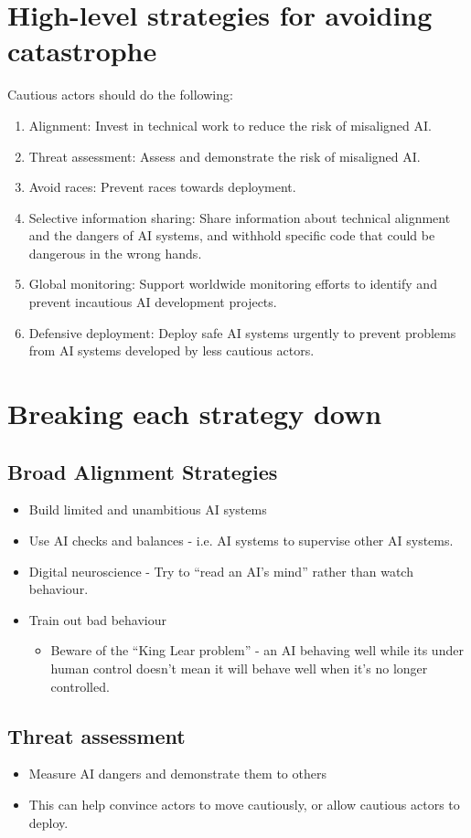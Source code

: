 \documentclass{article}
\begin{document}
\begin{multicols}{2}
\section{High-level strategies for avoiding catastrophe}
Cautious actors should do the following:
\begin{enumerate}
\item Alignment: Invest in technical work to reduce the risk of misaligned AI.
\item Threat assessment: Assess and demonstrate the risk of misaligned AI.
\item Avoid races: Prevent races towards deployment.
\item Selective information sharing: Share information about technical alignment and the dangers of AI systems, and withhold specific code that could be dangerous in the wrong hands.
\item Global monitoring: Support worldwide monitoring efforts to identify and prevent incautious AI development projects.
\item Defensive deployment: Deploy safe AI systems urgently to prevent problems from AI systems developed by less cautious actors.
\end{enumerate}
\section{Breaking each strategy down}
\subsection{Broad Alignment Strategies}
\begin{itemize}
\item Build limited and unambitious AI systems
\item Use AI checks and balances - i.e. AI systems to supervise other AI systems.
\item Digital neuroscience - Try to ``read an AI's mind'' rather than watch behaviour.
\item Train out bad behaviour
\begin{itemize}
\item Beware of the ``King Lear problem'' - an AI behaving well while its under human control doesn't mean it will behave well when it's no longer controlled.
\end{itemize}
\end{itemize}

\subsection{Threat assessment}
\begin{itemize}
\item Measure AI dangers and demonstrate them to others
\item This can help convince actors to move cautiously, or allow cautious actors to deploy.
\end{itemize}


\end{multicols}
\end{document}
